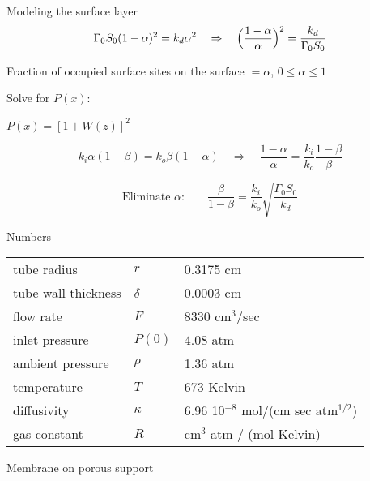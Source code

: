 \documentclass[12pt,a4paper]{beamer}
\begin{document}
\begin{CJK*}{UTF8}{gkai}
\begin{frame}{Modeling the surface layer}
\[
  \Gamma_0 S_0 (1-\alpha)^2 = k_d \alpha^2
  \quad \Rightarrow \quad
  \Bigl(\frac{1-\alpha}{\alpha}\Bigr)^2 = \frac{k_d}{\Gamma_0 S_0}
\]

Fraction of occupied surface sites on the surface $ = \alpha$, \quad
$0 \le \alpha \le 1$

\medskip

\begin{center}
  Solve for $P(x)$:\qquad
  \begin{onlinebox}{45mm} 
  	$\displaystyle P(x) = [ 1 + W(z)]^2$
  \end{onlinebox}
\end{center}

\medskip

\begin{displaybox}{90mm}
\[
  k_i \alpha (1-\beta) = k_o \beta (1-\alpha)
  \quad \Rightarrow \quad
  \frac{1-\alpha}{\alpha} = \frac{k_i}{k_o} \frac{1-\beta}{\beta}
\]

\[
  \text{Eliminate $\alpha$:} \qquad
  \frac{\beta}{1-\beta} = \frac{k_i}{k_o}
  \sqrt{\frac{\Gamma_0S_0}{k_d}} 
\]
\end{displaybox}
\end{frame}

\begin{frame}{Numbers}


\renewcommand{\arraystretch}{1.7}
\begin{tabular}{lll}
  tube radius & $r$ & 0.3175 cm \\
  tube wall thickness & $\delta$ & 0.0003 cm \\
  flow rate & $F$ & 8330 cm$^3$/sec \\
  inlet pressure & $P(0)$ & 4.08 atm \\
  ambient pressure & $\rho$ & 1.36 atm \\
  temperature & $T$ & 673 Kelvin \\
  diffusivity & $\kappa$ & 6.96 10$^{-8}$ mol/(cm sec atm$^{1/2}$) \\
  gas constant & $R$ & cm$^3$ atm / (mol Kelvin)
\end{tabular}

\end{frame}

\begin{frame}{Membrane on porous support}



\end{frame}
\end{CJK*}
\end{document}
